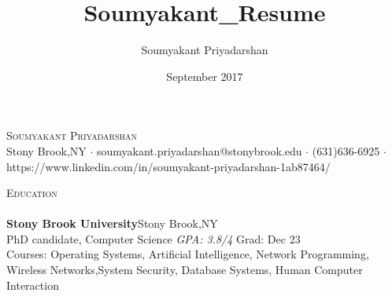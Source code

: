 \documentclass[a4paper]{article}
\title{Soumyakant_Resume}
\author{Soumyakant Priyadarshan}
\date{September 2017}
\newcommand{\lineunder} {
    \vspace*{-8pt} \\
    \hspace*{-18pt} \hrulefill \\
}
\newcommand{\header} [1] {
    {\hspace*{-18pt}\vspace*{6pt} \textsc{#1}}
    \vspace*{-6pt} \lineunder
}
\begin{document}
\begin{center}
	{\Huge \scshape {Soumyakant Priyadarshan}}\\
    Stony Brook,NY $\cdot$ soumyakant.priyadarshan@stonybrook.edu $\cdot$
    (631)636-6925 $\cdot$
    https://www.linkedin.com/in/soumyakant-priyadarshan-1ab87464/\\
\end{center}


\header{Education}
\textbf{Stony Brook University}\hfill Stony Brook,NY\\
PhD candidate, Computer Science \textit{GPA: 3.8/4} \hfill Grad: Dec 23\\
\newline 
Courses: Operating Systems, Artificial Intelligence, Network Programming,
Wireless Networks,System Security, Database Systems, Human Computer
Interaction\\
\end{document}

